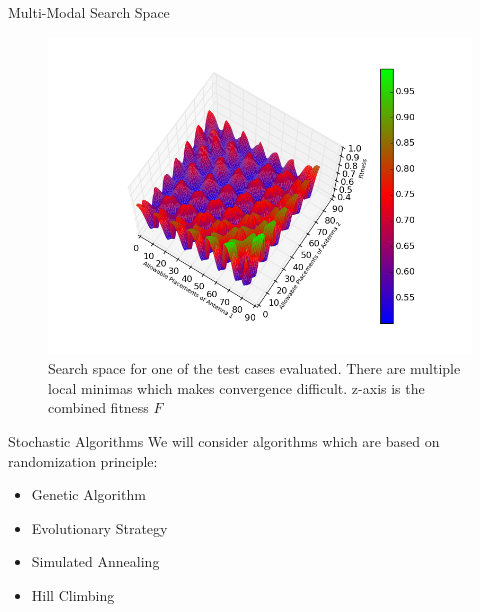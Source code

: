 \documentclass{beamer}
\begin{document}
\begin{frame}[t]{Multi-Modal Search Space}
    \begin{figure}
        \vspace*{-0.35cm}
        \centering
        \includegraphics[scale=0.4]{../paper/FIG/tc1_ss}
        \caption*{Search space for one of the test cases evaluated. There are multiple local minimas which makes convergence difficult. z-axis is the combined fitness $F$}
    \end{figure}
\end{frame}


\begin{frame}[t]{Stochastic Algorithms}
    We will consider algorithms which are based on randomization principle:
    \vspace{10px}
\begin{itemize} \itemsep1.5em
        \item Genetic Algorithm
        \item Evolutionary Strategy
        \item Simulated Annealing
        \item Hill Climbing
    \end{itemize}
\end{frame}
\end{document}
